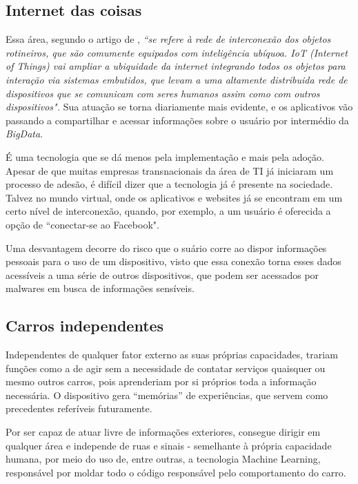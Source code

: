 \documentclass[12pt]{article}
\begin{document}
		\subsection{Internet das coisas}
		
		Essa área, segundo o artigo de \citet{xia_internet_2012}, \emph{``se refere à rede de interconexão dos objetos rotineiros, que são comumente equipados com inteligência ubíquoa. IoT (Internet of Things) vai ampliar a ubiquidade da internet integrando todos os objetos para interação via sistemas embutidos, que levam a uma altamente distribuida rede de dispositivos que se comunicam com seres humanos assim como com outros dispositivos".} Sua atuação se torna diariamente mais evidente, e os aplicativos vão passando a compartilhar e acessar informações sobre o usuário por intermédio da \emph{BigData}.
		
		É uma tecnologia que se dá menos pela implementação e mais pela adoção. Apesar de que muitas empresas transnacionais da área de TI já iniciaram um processo de adesão, é difícil dizer que a tecnologia já é presente na sociedade. Talvez no mundo virtual, onde os aplicativos e websites já se encontram em um certo nível de interconexão, quando, por exemplo, a um usuário é oferecida a opção de ``conectar-se ao Facebook".
		
		Uma desvantagem decorre do risco que o suário corre ao dispor informações pessoais para o uso de um dispositivo, visto que essa conexão torna esses dados acessíveis a uma série de outros dispositivos, que podem ser acessados por malwares em busca de informações sensíveis.
		
	
		\subsection{Carros independentes}
		
		Independentes de qualquer fator externo as suas próprias capacidades, trariam funções como a de agir sem a necessidade de contatar serviços quaisquer ou mesmo outros carros, pois aprenderiam por si próprios toda a informação necessária. O dispositivo gera “memórias” de experiências, que servem como precedentes referíveis futuramente.
		
		Por ser capaz de atuar livre de informações exteriores, consegue dirigir em qualquer área e independe de ruas e sinais - semelhante à própria capacidade humana, por meio do uso de, entre outras, a tecnologia Machine Learning, responsável por moldar todo o código responsável pelo comportamento do carro.
		
\end{document}
